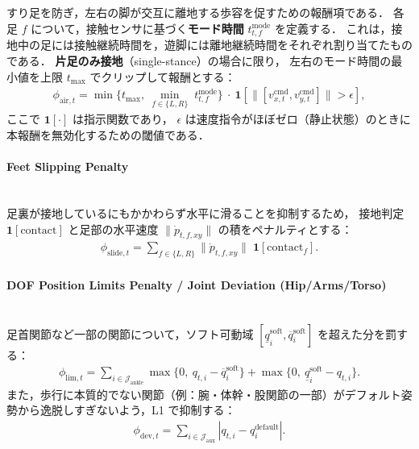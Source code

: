 すり足を防ぎ，左右の脚が交互に離地する歩容を促すための報酬項である．
各足 $f$ について，接触センサに基づく\textbf{モード時間} $t_{t,f}^{\mathrm{mode}}$ を定義する．
これは，接地中の足には接触継続時間を，遊脚には離地継続時間をそれぞれ割り当てたものである．
\textbf{片足のみ接地}（single-stance）の場合に限り，
左右のモード時間の最小値を上限 $t_{\max}$ でクリップして報酬とする：
\begin{align}
  \phi_{\mathrm{air},t} = \min\{t_{\max},\ \min_{f\in\{L,R\}} \;t_{t,f}^{\mathrm{mode}}\}\ \cdot\ \mathbf{1}[\|[v^{\mathrm{cmd}}_{x,t}, v^{\mathrm{cmd}}_{y,t}]\|>\epsilon],
  \label{eq:task_air_time}
\end{align}
ここで $\mathbf{1}[\cdot]$ は指示関数であり，
$\epsilon$ は速度指令がほぼゼロ（静止状態）のときに本報酬を無効化するための閾値である．

\paragraph{Feet Slipping Penalty}\quad\\

足裏が接地しているにもかかわらず水平に滑ることを抑制するため，
接地判定 $\mathbf{1}[\mathrm{contact}]$ と足部の水平速度 $\|\dot{p}_{t,f,xy}\|$ の積をペナルティとする：
\begin{align}
  \phi_{\mathrm{slide},t} = \sum_{f\in\{L,R\}} \|\dot{p}_{t,f,xy}\|\;\mathbf{1}[\mathrm{contact}_f].
  \label{eq:task_feet_slide}
\end{align}

\paragraph{DOF Position Limits Penalty / Joint Deviation (Hip/Arms/Torso)}\quad\\

足首関節など一部の関節について，ソフト可動域 $[\underline{q}^{\mathrm{soft}}_i, \overline{q}^{\mathrm{soft}}_i]$ を超えた分を罰する：
\begin{align}
  \phi_{\mathrm{lim},t} = \sum_{i\in\mathcal{J}_{\mathrm{ankle}}}
  \max\{0,\ q_{t,i}-\overline{q}^{\mathrm{soft}}_i\} + \max\{0,\ \underline{q}^{\mathrm{soft}}_i-q_{t,i}\}.
  \label{eq:task_joint_limits}
\end{align}
また，歩行に本質的でない関節（例：腕・体幹・股関節の一部）がデフォルト姿勢から逸脱しすぎないよう，L1 で抑制する：
\begin{align}
  \phi_{\mathrm{dev},t} = \sum_{i\in\mathcal{J}_{\mathrm{aux}}} \left|q_{t,i} - q^{\mathrm{default}}_i\right|.
  \label{eq:task_joint_dev}
\end{align}

